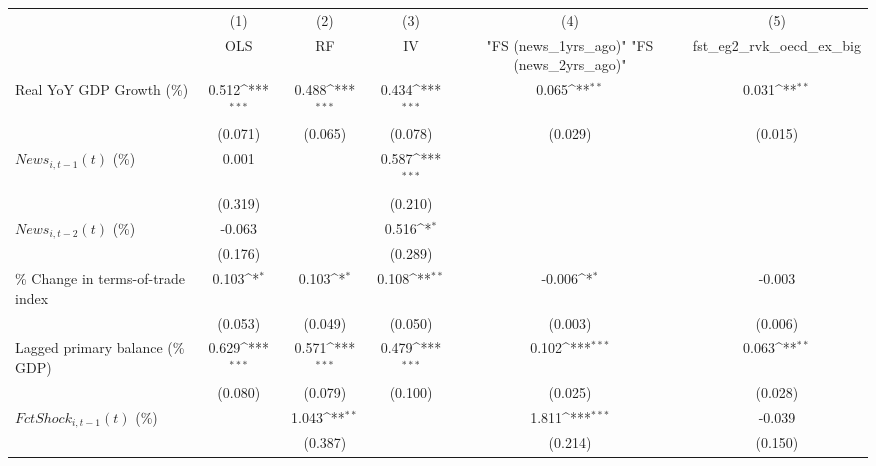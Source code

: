{
\def\sym#1{\ifmmode^{#1}\else\(^{#1}\)\fi}
\begin{tabular}{l*{5}{c}}
\toprule
                    &\multicolumn{1}{c}{(1)}&\multicolumn{1}{c}{(2)}&\multicolumn{1}{c}{(3)}&\multicolumn{1}{c}{(4)}&\multicolumn{1}{c}{(5)}\\
                    &\multicolumn{1}{c}{OLS}&\multicolumn{1}{c}{RF}&\multicolumn{1}{c}{IV}&\multicolumn{1}{c}{ "FS (news_1yrs_ago)"  "FS (news_2yrs_ago)" }&\multicolumn{1}{c}{fst_eg2_rvk_oecd_ex_big}\\
\midrule
Real YoY GDP Growth (\%)&       0.512\sym{***}&       0.488\sym{***}&       0.434\sym{***}&       0.065\sym{**} &       0.031\sym{**} \\
                    &     (0.071)         &     (0.065)         &     (0.078)         &     (0.029)         &     (0.015)         \\
\addlinespace
$ News_{i,t-1}(t)$ (\%)&       0.001         &                     &       0.587\sym{***}&                     &                     \\
                    &     (0.319)         &                     &     (0.210)         &                     &                     \\
\addlinespace
$ News_{i,t-2}(t)$ (\%)&      -0.063         &                     &       0.516\sym{*}  &                     &                     \\
                    &     (0.176)         &                     &     (0.289)         &                     &                     \\
\addlinespace
\% Change in terms-of-trade index&       0.103\sym{*}  &       0.103\sym{*}  &       0.108\sym{**} &      -0.006\sym{*}  &      -0.003         \\
                    &     (0.053)         &     (0.049)         &     (0.050)         &     (0.003)         &     (0.006)         \\
\addlinespace
Lagged primary balance (\% GDP)&       0.629\sym{***}&       0.571\sym{***}&       0.479\sym{***}&       0.102\sym{***}&       0.063\sym{**} \\
                    &     (0.080)         &     (0.079)         &     (0.100)         &     (0.025)         &     (0.028)         \\
\addlinespace
$ FctShock_{i,t-1}(t)$ (\%)&                     &       1.043\sym{**} &                     &       1.811\sym{***}&      -0.039         \\
                    &                     &     (0.387)         &                     &     (0.214)         &     (0.150)         \\

\end{tabular}}

